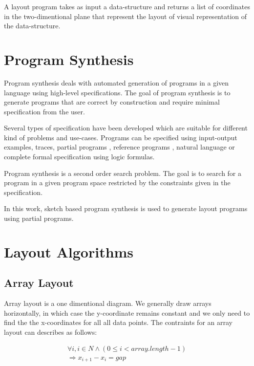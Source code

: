 \documentclass{article}
\begin{document}
A layout program takes as input a data-structure and returns a list of
coordinates in the two-dimentional plane that represent the layout of
visual representation of the data-structure.

\section{Program Synthesis}

Program synthesis deals with automated generation of programs in a
given language using high-level specifications.  The goal of program
synthesis is to generate programs that are correct by construction and
require minimal specification from the user.

Several types of specification have been developed which are suitable
for different kind of problems and use-cases.  Programs can be
specified using input-output examples\cite{pbe1}, traces, partial
programs \cite{sketch}, reference programs \cite{sketch}, natural
language \cite{nlsynth} or complete formal
specification\cite{verifysynth} using logic formulas.

Program synthesis is a second order search problem.  The goal is to
search for a program in a given program space restricted by the
constraints given in the specification.

In this work, sketch based program synthesis is used to generate
layout programs using partial programs.

\section{Layout Algorithms}

\subsection{Array Layout}

Array layout is a one dimentional diagram.  We generally draw arrays
horizontally, in which case the y-coordinate remains constant and we
only need to find the the x-coordinates for all all data points.  The
contraints for an array layout can describes as follows:


\begin{equation}
  \begin{split}
    \forall i, i \in N \wedge (0 \leq i < array.length - 1) \\
    \Longrightarrow x_{i+1} - x_{i} = gap
  \end{split}
\end{equation}
\end{document}
